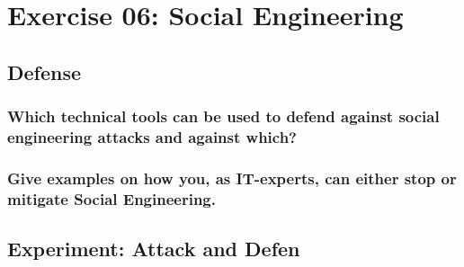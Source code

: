 \section*{Exercise 06: Social Engineering}

\subsection*{Defense}
\subsubsection*{Which technical tools can be used to defend against social engineering attacks and against which?}
\subsubsection*{Give examples on how you, as IT-experts, can either stop or mitigate Social Engineering.}

\subsection*{Experiment: Attack and Defen}